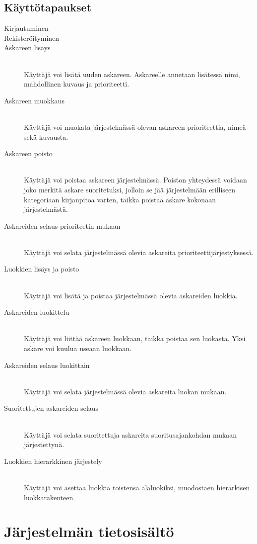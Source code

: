 ﻿\documentclass[finnish]{report}
\begin{document}
\section{Käyttötapaukset}
\begin{description}
  \item[Kirjautuminen]
  \item[Rekisteröityminen]
  \item[Askareen lisäys] \hfill \\
    Käyttäjä voi lisätä uuden askareen. Askareelle annetaan lisätessä nimi, mahdollinen kuvaus ja prioriteetti.
  \item[Askareen muokkaus] \hfill \\
    Käyttäjä voi muokata järjestelmässä olevan askareen prioriteettia, nimeä sekä kuvausta.
  \item[Askareen poisto] \hfill \\
    Käyttäjä voi poistaa askareen järjestelmässä. Poiston yhteydessä voidaan joko merkitä askare suoritetuksi, jolloin se jää järjestelmään erilliseen kategoriaan kirjanpitoa varten, taikka poistaa askare kokonaan järjestelmästä.
  \item[Askareiden selaus prioriteetin mukaan] \hfill \\
    Käyttäjä voi selata järjestelmässä olevia askareita prioriteettijärjestyksessä.
  \item[Luokkien lisäys ja poisto] \hfill \\
    Käyttäjä voi lisätä ja poistaa järjestelmässä olevia askareiden luokkia.
  \item[Askareiden luokittelu] \hfill \\
    Käyttäjä voi liittää askareen luokkaan, taikka poistaa sen luokasta. Yksi askare voi kuulua useaan luokkaan.
  \item[Askareiden selaus luokittain] \hfill \\
    Käyttäjä voi selata järjestelmässä olevia askareita luokan mukaan.
  \item[Suoritettujen askareiden selaus] \hfill \\
    Käyttäjä voi selata suoritettuja askareita suoritusajankohdan mukaan järjestettynä.
  \item[Luokkien hierarkkinen järjestely] \hfill \\
    Käyttäjä voi asettaa luokkia toistensa alaluokiksi, muodostaen hierarkisen luokkarakenteen.
\end{description}


\chapter{Järjestelmän tietosisältö}
\end{document}

